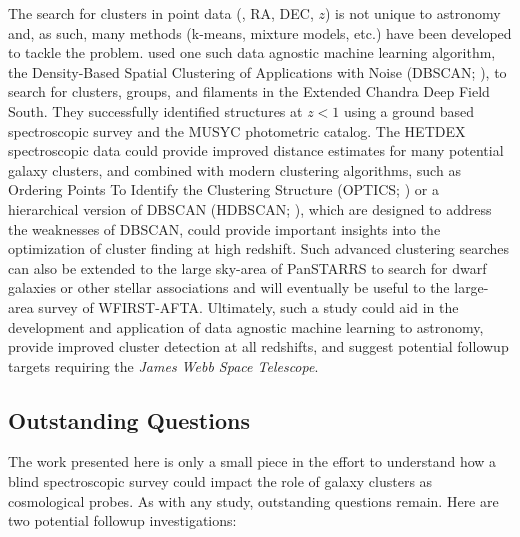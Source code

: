 The search for clusters in point data (\eg, RA, DEC, $z$) is not unique to astronomy and, as such, many methods (k-means, mixture models, etc.) have been developed to tackle the problem. \cite{Dehghan2014} used one such data agnostic machine learning algorithm, the Density-Based Spatial Clustering of Applications with Noise (DBSCAN; \citealt{Ester1996}), to search for clusters, groups, and filaments in the Extended Chandra Deep Field South. They successfully identified structures at $z<1$ using a ground based spectroscopic survey and the MUSYC photometric catalog. The HETDEX spectroscopic data could provide improved distance estimates for many potential galaxy clusters, and combined with modern clustering algorithms, such as Ordering Points To Identify the Clustering Structure (OPTICS; \citealt{Ankerst1999}) or a hierarchical version of DBSCAN (HDBSCAN; \citealt{Campello2013}), which are designed to address the weaknesses of DBSCAN, could provide important insights into the optimization of cluster finding at high redshift. Such advanced clustering searches can also be extended to the large sky-area of PanSTARRS to search for dwarf galaxies or other stellar associations and will eventually be useful to the large-area survey of WFIRST-AFTA. Ultimately, such a study could aid in the development and application of data agnostic machine learning to astronomy, provide improved cluster detection at all redshifts, and suggest potential followup targets requiring the \emph{James Webb Space Telescope}.

\subsection{Outstanding Questions}
The work presented here is only a small piece in the effort to understand how a blind spectroscopic survey could impact the role of galaxy clusters as cosmological probes. As with any study, outstanding questions remain. Here are two potential followup investigations:

